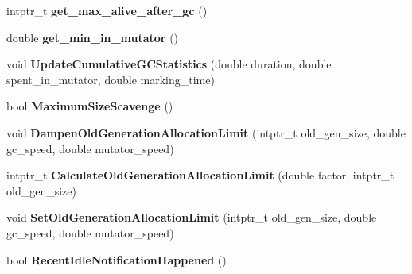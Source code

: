 \begin{DoxyCompactItemize}
\item 
intptr\+\_\+t {\bfseries get\+\_\+max\+\_\+alive\+\_\+after\+\_\+gc} ()\hypertarget{classv8_1_1internal_1_1_heap_ad541f7579dbffceb0e559825016eee34}{}\label{classv8_1_1internal_1_1_heap_ad541f7579dbffceb0e559825016eee34}

\item 
double {\bfseries get\+\_\+min\+\_\+in\+\_\+mutator} ()\hypertarget{classv8_1_1internal_1_1_heap_a7d5f7ef977f405d5e49d086dce144cca}{}\label{classv8_1_1internal_1_1_heap_a7d5f7ef977f405d5e49d086dce144cca}

\item 
void {\bfseries Update\+Cumulative\+G\+C\+Statistics} (double duration, double spent\+\_\+in\+\_\+mutator, double marking\+\_\+time)\hypertarget{classv8_1_1internal_1_1_heap_a78fa9db9b3c973772249692fe97c4626}{}\label{classv8_1_1internal_1_1_heap_a78fa9db9b3c973772249692fe97c4626}

\item 
bool {\bfseries Maximum\+Size\+Scavenge} ()\hypertarget{classv8_1_1internal_1_1_heap_afe5afc48d4179771b014dfc8adeda120}{}\label{classv8_1_1internal_1_1_heap_afe5afc48d4179771b014dfc8adeda120}

\item 
void {\bfseries Dampen\+Old\+Generation\+Allocation\+Limit} (intptr\+\_\+t old\+\_\+gen\+\_\+size, double gc\+\_\+speed, double mutator\+\_\+speed)\hypertarget{classv8_1_1internal_1_1_heap_a6cf3043360369e1140720c853250b866}{}\label{classv8_1_1internal_1_1_heap_a6cf3043360369e1140720c853250b866}

\item 
intptr\+\_\+t {\bfseries Calculate\+Old\+Generation\+Allocation\+Limit} (double factor, intptr\+\_\+t old\+\_\+gen\+\_\+size)\hypertarget{classv8_1_1internal_1_1_heap_a83cb384da7f46b0dac4ba67399679634}{}\label{classv8_1_1internal_1_1_heap_a83cb384da7f46b0dac4ba67399679634}

\item 
void {\bfseries Set\+Old\+Generation\+Allocation\+Limit} (intptr\+\_\+t old\+\_\+gen\+\_\+size, double gc\+\_\+speed, double mutator\+\_\+speed)\hypertarget{classv8_1_1internal_1_1_heap_a9d016dfda8eef369ae6a48be40344500}{}\label{classv8_1_1internal_1_1_heap_a9d016dfda8eef369ae6a48be40344500}

\item 
bool {\bfseries Recent\+Idle\+Notification\+Happened} ()\hypertarget{classv8_1_1internal_1_1_heap_a8cfee862649062c78d627e6aaa2161ee}{}\label{classv8_1_1internal_1_1_heap_a8cfee862649062c78d627e6aaa2161ee}


\end{DoxyCompactItemize}
